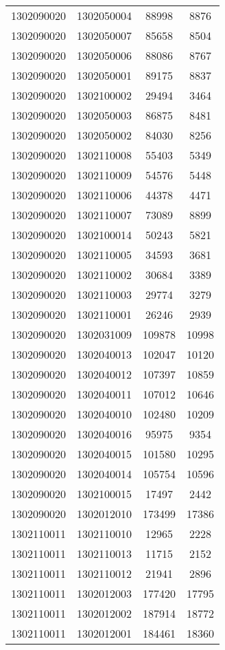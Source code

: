 \begin{longtable}{llcc}
1302090020 & 1302050004 & 88998 & 8876\\
1302090020 & 1302050007 & 85658 & 8504\\
1302090020 & 1302050006 & 88086 & 8767\\
1302090020 & 1302050001 & 89175 & 8837\\
1302090020 & 1302100002 & 29494 & 3464\\
1302090020 & 1302050003 & 86875 & 8481\\
1302090020 & 1302050002 & 84030 & 8256\\
1302090020 & 1302110008 & 55403 & 5349\\
1302090020 & 1302110009 & 54576 & 5448\\
1302090020 & 1302110006 & 44378 & 4471\\
1302090020 & 1302110007 & 73089 & 8899\\
1302090020 & 1302100014 & 50243 & 5821\\
1302090020 & 1302110005 & 34593 & 3681\\
1302090020 & 1302110002 & 30684 & 3389\\
1302090020 & 1302110003 & 29774 & 3279\\
1302090020 & 1302110001 & 26246 & 2939\\
1302090020 & 1302031009 & 109878 & 10998\\
1302090020 & 1302040013 & 102047 & 10120\\
1302090020 & 1302040012 & 107397 & 10859\\
1302090020 & 1302040011 & 107012 & 10646\\
1302090020 & 1302040010 & 102480 & 10209\\
1302090020 & 1302040016 & 95975 & 9354\\
1302090020 & 1302040015 & 101580 & 10295\\
1302090020 & 1302040014 & 105754 & 10596\\
1302090020 & 1302100015 & 17497 & 2442\\
1302090020 & 1302012010 & 173499 & 17386\\
1302110011 & 1302110010 & 12965 & 2228\\
1302110011 & 1302110013 & 11715 & 2152\\
1302110011 & 1302110012 & 21941 & 2896\\
1302110011 & 1302012003 & 177420 & 17795\\
1302110011 & 1302012002 & 187914 & 18772\\
1302110011 & 1302012001 & 184461 & 18360\\

\end{longtable}

